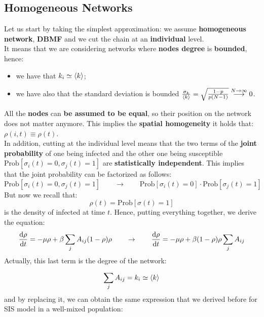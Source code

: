 \documentclass[../main/main.tex]{subfiles}
\begin{document}
\subsection{Homogeneous Networks}
Let us start by taking the simplest approximation: we assume \textbf{homogeneous network}, \textbf{DBMF} and we cut the chain at an \textbf{individual} level.\\

It means that we are considering networks where \textbf{nodes degree} is \textbf{bounded}, hence:
\begin{itemize}
\item we have that \( k_i \simeq \expval{k}  \);
\item we have also that the standard deviation is bounded \( \frac{\sigma _k}{\expval{k} } = \sqrt{ \frac{1-p}{p(N-1)} } \overset{N \rightarrow \infty }{\longrightarrow} 0\).
\end{itemize}
All the \textbf{nodes} can \textbf{be assumed to be equal}, so their position on the network does not matter anymore. This implies the \textbf{spatial homogeneity} it holds that: \( \rho (i,t) \equiv \rho (t) \).\\
In addition, cutting at the individual level means that the two terms of the \textbf{joint probability} of one being infected and the other one being susceptible \( \text{Prob} [\sigma _i (t) = 0, \sigma _j (t ) =1 ] \) are \textbf{statistically independent}. This implies that the joint probability can be factorized as follows:
\begin{equation*}
  \text{Prob} [\sigma _i (t) = 0, \sigma _j (t ) =1 ] \qquad \rightarrow \qquad \text{Prob} [\sigma _i (t) = 0] \cdot \text{Prob} [\sigma _j (t ) =1 ]
\end{equation*}
But now we recall that:
\begin{equation*}
  \rho (t) = \text{Prob} [\sigma (t)=1]
\end{equation*}
is the density of infected at time \( t \).
Hence, putting everything together, we derive the equation:
\begin{equation*}
  \dv{\rho }{t} = - \mu \rho  + \beta \sum_{j}^{} A_{ij} (1- \rho ) \rho \qquad \rightarrow \qquad
   \dv{\rho }{t} = - \mu \rho  + \beta (1- \rho ) \rho \sum_{j}^{} A_{ij}
\end{equation*}
Actually, this last term is the degree of the network:
\begin{equation}
  \sum_{j}^{} A_{ij} = k_i \simeq \expval{k}
\end{equation}
and by replacing it, we can obtain the same expression that we derived before for SIS model in a well-mixed population:
\end{document}
